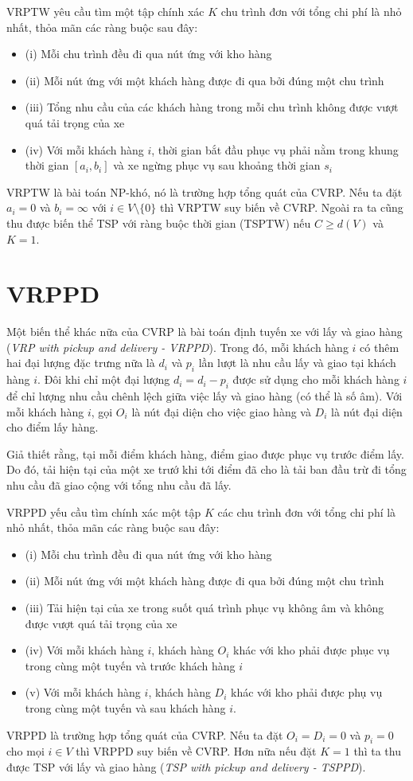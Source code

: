 VRPTW yêu cầu tìm một tập chính xác $K$ chu trình đơn với tổng chi phí là nhỏ nhất, thỏa mãn các ràng buộc sau đây:
\begin{itemize}
  \item[] (i) Mỗi chu trình đều đi qua nút ứng với kho hàng
  \item[] (ii) Mỗi nút ứng với một khách hàng được đi qua bởi đúng một chu trình
  \item[] (iii) Tổng nhu cầu của các khách hàng trong mỗi chu trình không được vượt quá tải trọng của xe
  \item[] (iv) Với mỗi khách hàng $i$, thời gian bắt đầu phục vụ phải nằm trong khung thời gian $[a_i, b_i]$ và xe ngừng phục vụ sau khoảng thời gian $s_i$
\end{itemize}

VRPTW là bài toán NP-khó, nó là trường hợp tổng quát của CVRP. Nếu ta đặt $a_i=0$ và $b_i=\infty$ với $i \in V \setminus \{0\}$ thì VRPTW suy biến về CVRP. Ngoài ra ta cũng thu được biến thể TSP với ràng buộc thời gian (TSPTW) nếu $C \geq d(V)$ và $K=1$.

\section{VRPPD}
Một biến thể khác nữa của CVRP là bài toán định tuyến xe với lấy và giao hàng (\textit{VRP with pickup and delivery - VRPPD}). Trong đó, mỗi khách hàng $i$ có thêm hai đại lượng đặc trưng nữa là $d_i$ và $p_i$ lần lượt là nhu cầu lấy và giao tại khách hàng $i$. Đôi khi chỉ một đại lượng $d_i = d_i - p_i$ được sử dụng cho mỗi khách hàng $i$ để chỉ lượng nhu cầu chênh lệch giữa việc lấy và giao hàng (có thể là số âm). Với mỗi khách hàng $i$, gọi $O_i$ là nút đại diện cho việc giao hàng và $D_i$ là nút đại diện cho điểm lấy hàng. 

Giả thiết rằng, tại mỗi điểm khách hàng, điểm giao được phục vụ trước điểm lấy. Do đó, tải hiện tại của một xe trướ khi tới điểm đã cho là tải ban đầu trừ đi tổng nhu cầu đã giao cộng với tổng nhu cầu đã lấy.

VRPPD yếu cầu tìm chính xác một tập $K$ các chu trình đơn với tổng chi phí là nhỏ nhất, thỏa mãn các ràng buộc sau đây:

\begin{itemize}
  \item[] (i) Mỗi chu trình đều đi qua nút ứng với kho hàng
  \item[] (ii) Mỗi nút ứng với một khách hàng được đi qua bởi đúng một chu trình
  \item[] (iii) Tải hiện tại của xe trong suốt quá trình phục vụ không âm và không được vượt quá tải trọng của xe
  \item[] (iv) Với mỗi khách hàng $i$, khách hàng $O_i$ khác với kho phải được phục vụ trong cùng một tuyến và trước khách hàng $i$
  \item[] (v) Với mỗi khách hàng $i$, khách hàng $D_i$ khác với kho phải được phụ vụ trong cùng một tuyến và sau khách hàng $i$.
\end{itemize}

VRPPD là trường hợp tổng quát của CVRP. Nếu ta đặt $O_i = D_i = 0$ và $p_i = 0$ cho mọi $i \in V$ thì VRPPD suy biến về CVRP. Hơn nữa nếu đặt $K=1$ thì ta thu được TSP với lấy và giao hàng (\textit{TSP with pickup and delivery - TSPPD}).
